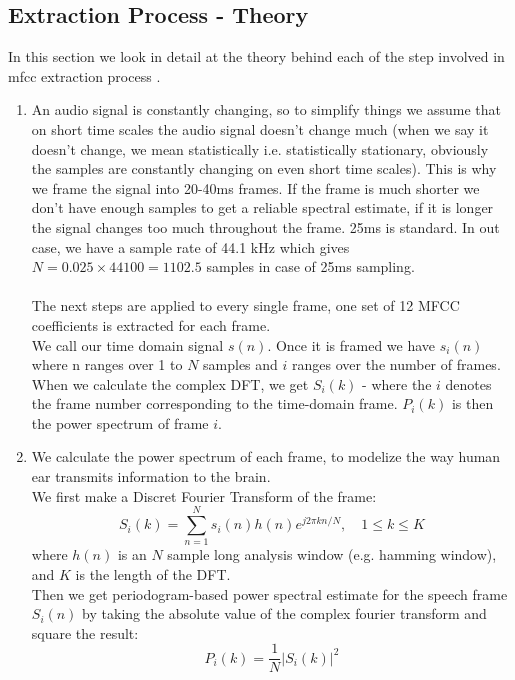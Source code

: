 \documentclass{article} %
\begin{document}
    \subsection{Extraction Process - Theory}
	In this section we look in detail at the theory behind each of the step involved in mfcc extraction process \cite{cite7}.
	\begin{enumerate}
		\item An audio signal is constantly changing, so to simplify things we assume that on short time scales the audio signal doesn't change much (when we say it doesn't change, we mean statistically i.e. statistically stationary, obviously the samples are constantly changing on even short time scales). This is why we frame the signal into 20-40ms frames. If the frame is much shorter we don't have enough samples to get a reliable spectral estimate, if it is longer the signal changes too much throughout the frame. 25ms is standard. In out case, we have a sample rate of 44.1 kHz which gives $N = 0.025 \times 44100 = 1102.5$ samples in case of 25ms sampling.\\\\
			The next steps are applied to every single frame, one set of 12 MFCC coefficients is extracted for each frame.\\ We call our time domain signal $s(n)$. Once it is framed we have $s_i(n)$ where n ranges over 1 to $N$ samples and $i$ ranges over the number of frames. When we calculate the complex DFT, we get $S_i(k)$ - where the $i$ denotes the frame number corresponding to the time-domain frame. $P_i(k)$ is then the power spectrum of frame $i$.
		\item We calculate the power spectrum of each frame, to modelize the way human ear transmits information to the brain.\\
		We first make a Discret Fourier Transform of the frame:\\
		$$S_i(k) = \displaystyle\sum_{n=1}^N s_i(n)h(n)e^{j2\pi kn /N}, \quad 1 \leq k \leq K$$
		where $h(n)$ is an $N$ sample long analysis window (e.g. hamming window), and $K$ is the length of the DFT.\\
		Then we get periodogram-based power spectral estimate for the speech frame $S_i(n)$ by taking the absolute value of the complex fourier transform and square the result:\\
		$$P_i(k) = \frac{1}{N} |S_i(k)|^2$$


\end{enumerate}
\end{document}

